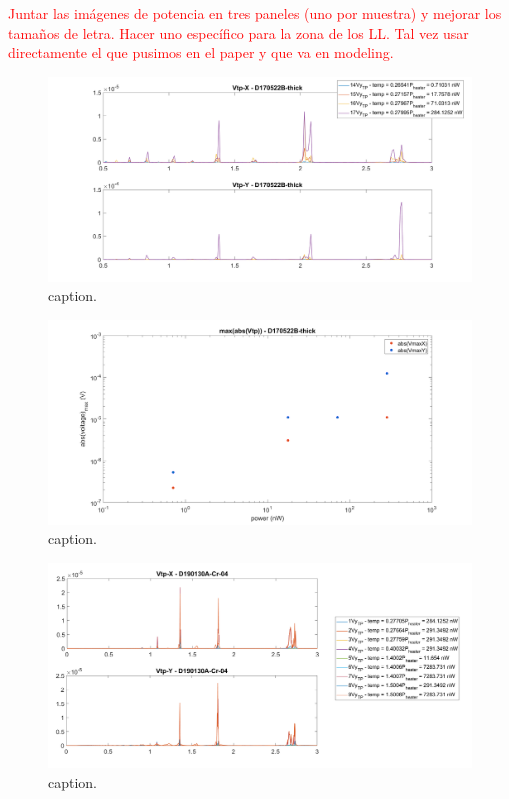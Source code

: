 \textcolor{red}{Juntar las imágenes de potencia en tres paneles (uno por muestra) y mejorar los tamaños de letra. Hacer uno específico para la zona de los LL. Tal vez usar directamente el que pusimos en el paper y que va en modeling.}

\begin{figure}
    \includegraphics[width=1\textwidth]{figures/experimental/powerDependance/D170522B-thick-cambio-potencia-01.png}
    \caption{caption.}
    \label{fig:D170522B_thick_power_01}
\end{figure}


\begin{figure}
    \includegraphics[width=1\textwidth]{figures/experimental/powerDependance/D170522B-thick-cambio-potencia-02.png}
    \caption{caption.}
    \label{fig:D170522B_thick_power_02}
\end{figure}


\begin{figure}
    \includegraphics[width=1\textwidth]{figures/experimental/powerDependance/D190130A-Cr-04-todas.png}
    \caption{caption.}
    \label{fig:D190130A_Cr_power}
\end{figure}


